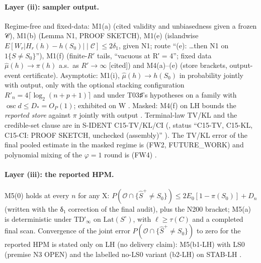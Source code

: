 \paragraph{Layer (ii): sampler output.} Regime-free and fixed-data: M1(a) (cited validity and unbiasedness given a frozen 𝒞), M1(b) (Lemma N1, PROOF SKETCH), M1(e) (islandwise $E[W_r|H_r(h)-h(S_0)|\mid\mathcal{C}]\le2\delta_1$, given N1; route ``(e): \ldots then N1 on $1\{S\ne S_0\}$''), M1(f) (finite-$R'$ tails, ``vacuous at R′ = 4''; fixed data $\hat{\mu}(h)\to\pi(h)$ a.s.\ as $R'\to\infty$ [cited]) and M4(a)–(e) (store brackets, output-event certificate). Asymptotic: M1(i), $\hat{\mu}(h)\to h(S_0)$ in probability jointly with output, only with the optional stacking configuration $R'_n=4\lceil\log_2(n+p+1)\rceil$ and under T03♯'s hypotheses on a family with $\operatorname{osc} d\le D_{*}=O_P(1)$; exhibited on W . Masked: M4(f) on LH bounds the \emph{reported store} against $\pi$ jointly with output . Terminal-law TV/KL and the credible-set clause are in S-IDENT C15-TV/KL/CI (, status ``C15-TV, C15-KL, C15-CI: PROOF SKETCH, unchecked (assembly)'' ). The TV/KL error of the final pooled estimate in the masked regime is  (FW2, FUTURE\_WORK) and polynomial mixing of the $\varphi=1$ round is  (FW4) .

\paragraph{Layer (iii): the reported HPM.} M5(0) holds at every $n$ for any X: $P(\mathcal{O}\cap\{\hat{S}^{+}\ne S_0\})\le 2E_0[1-\pi(S_0)]+D_n$ (written with the δ₁ correction of the final audit), plus the N200 bracket; M5(a) is deterministic under TD′$_{\infty}$ on $\mathrm{Lat}(S^\circ)$, with $\ell\ge\tau(C)$ and a completed final scan. Convergence of the joint error $P(\mathcal{O}\cap\{\hat{S}^{+}\ne S_0\})$ to zero for the reported HPM is stated only on LH (no delivery claim): M5(b1-LH) with LS0 (premise N3 OPEN) and the labelled no-LS0 variant (b2-LH) on STAB-LH .

